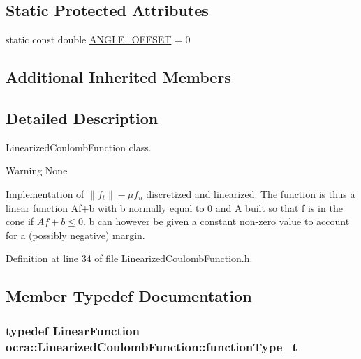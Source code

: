 \subsection*{Static Protected Attributes}
\begin{DoxyCompactItemize}
\item 
static const double \hyperlink{classocra_1_1LinearizedCoulombFunction_a1778e1ecca6c7d54f846a750f9a06552}{A\+N\+G\+L\+E\+\_\+\+O\+F\+F\+S\+ET} = 0
\end{DoxyCompactItemize}
\subsection*{Additional Inherited Members}


\subsection{Detailed Description}
Linearized\+Coulomb\+Function class. 

\begin{DoxyWarning}{Warning}
None
\end{DoxyWarning}
Implementation of $ \left\|f_t\right\| - \mu f_n $ discretized and linearized. The function is thus a linear function Af+b with b normally equal to 0 and A built so that f is in the cone if $ Af+b \le 0 $. b can however be given a constant non-\/zero value to account for a (possibly negative) margin. 

Definition at line 34 of file Linearized\+Coulomb\+Function.\+h.



\subsection{Member Typedef Documentation}
\subsubsection[{\texorpdfstring{function\+Type\+\_\+t}{functionType_t}}]{\setlength{\rightskip}{0pt plus 5cm}typedef {\bf Linear\+Function} {\bf ocra\+::\+Linearized\+Coulomb\+Function\+::function\+Type\+\_\+t}}\hypertarget{classocra_1_1LinearizedCoulombFunction_a3b8f1d487a59ea860aee65223cc7c6aa}{}\label{classocra_1_1LinearizedCoulombFunction_a3b8f1d487a59ea860aee65223cc7c6aa}


